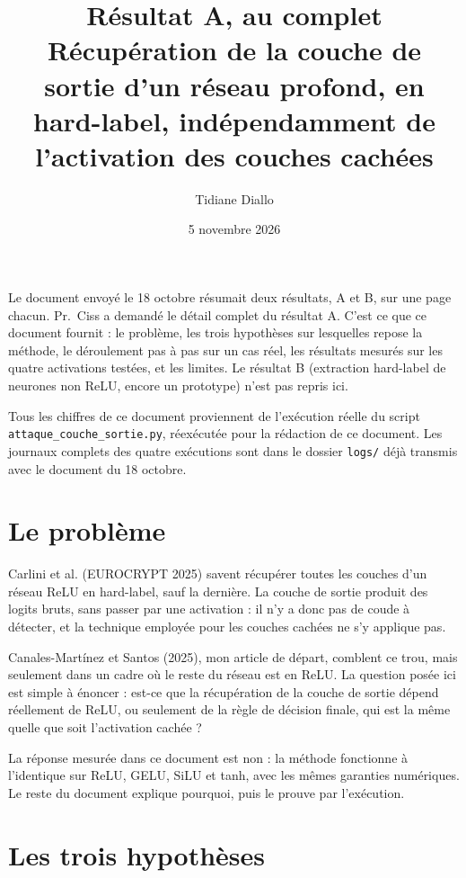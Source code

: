 \documentclass[11pt]{article}
\title{Résultat A, au complet\\[0.3em]
\large Récupération de la couche de sortie d'un réseau profond, en hard-label,
indépendamment de l'activation des couches cachées}
\author{Tidiane Diallo}
\date{5 novembre 2026}
\begin{document}
\maketitle

\begin{remarque}
Le document envoyé le 18 octobre résumait deux résultats, A et B, sur une
page chacun. Pr.~Ciss a demandé le détail complet du résultat A. C'est ce que
ce document fournit : le problème, les trois hypothèses sur lesquelles repose
la méthode, le déroulement pas à pas sur un cas réel, les résultats mesurés
sur les quatre activations testées, et les limites. Le résultat B (extraction
hard-label de neurones non ReLU, encore un prototype) n'est pas repris ici.

Tous les chiffres de ce document proviennent de l'exécution réelle du script
\texttt{attaque\_couche\_sortie.py}, réexécutée pour la rédaction de ce
document. Les journaux complets des quatre exécutions sont dans le dossier
\texttt{logs/} déjà transmis avec le document du 18 octobre.
\end{remarque}

\tableofcontents

\section{Le problème}

Carlini et al. (EUROCRYPT 2025) savent récupérer toutes les couches d'un
réseau ReLU en hard-label, sauf la dernière. La couche de sortie produit des
logits bruts, sans passer par une activation : il n'y a donc pas de coude à
détecter, et la technique employée pour les couches cachées ne s'y applique
pas.

Canales-Martínez et Santos (2025), mon article de départ, comblent ce trou,
mais seulement dans un cadre où le reste du réseau est en ReLU. La question
posée ici est simple à énoncer : est-ce que la récupération de la couche de
sortie dépend réellement de ReLU, ou seulement de la règle de décision
finale, qui est la même quelle que soit l'activation cachée ?

La réponse mesurée dans ce document est non : la méthode fonctionne à
l'identique sur ReLU, GELU, SiLU et tanh, avec les mêmes garanties
numériques. Le reste du document explique pourquoi, puis le prouve par
l'exécution.

\section{Les trois hypothèses}
\end{document}
